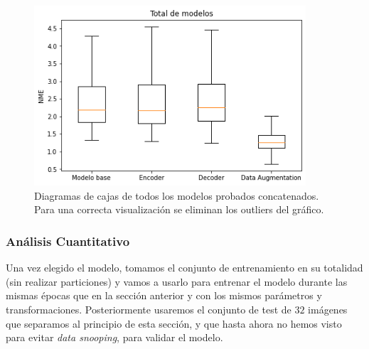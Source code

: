         \begin{figure}[H]
            \centering
            \includegraphics[width=0.9\textwidth]{img/boxplot_sumarize.png}
            \caption{Diagramas de cajas de todos los modelos probados concatenados. Para una correcta visualización se eliminan los outliers del gráfico.}
            \label{fig:boxplot_summary}
        \end{figure}

        
        \subsubsection*{Análisis Cuantitativo}
        

        \noindent Una vez elegido el modelo, tomamos el conjunto de entrenamiento en su totalidad (sin realizar particiones) y vamos a usarlo para entrenar el modelo durante las mismas épocas que en la sección anterior y con los mismos parámetros y transformaciones. Posteriormente usaremos el conjunto de test de $32$ imágenes que separamos al principio de esta sección, y que hasta ahora no hemos visto para evitar \textit{data snooping}, para validar el modelo.


